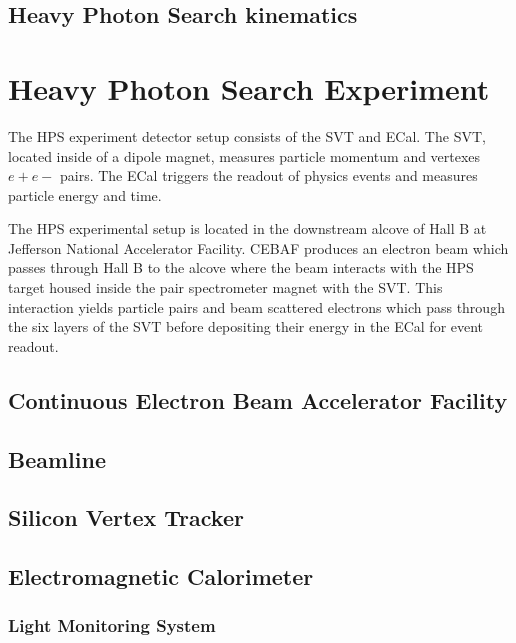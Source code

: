 \documentclass[12pt]{report}
\begin{document}
\section{Heavy Photon Search kinematics}




\chapter{Heavy Photon Search Experiment}
The HPS experiment detector setup consists of the SVT and ECal. The SVT, located inside of a dipole magnet, measures particle momentum and vertexes $e+e-$ pairs. The ECal triggers the readout of physics events and measures particle energy and time. \par
The HPS experimental setup is located in the downstream alcove of Hall B at Jefferson National Accelerator Facility. CEBAF produces an electron beam which passes through Hall B to the alcove where the beam interacts with the HPS target housed inside the pair spectrometer magnet with the SVT. This interaction yields particle pairs and beam scattered electrons which pass through the six layers of the SVT before depositing their energy in the ECal for event readout.

\section{Continuous Electron Beam Accelerator Facility}


\section{Beamline}


\section{Silicon Vertex Tracker}


\section{Electromagnetic Calorimeter}


\subsection{Light Monitoring System}

\end{document}
